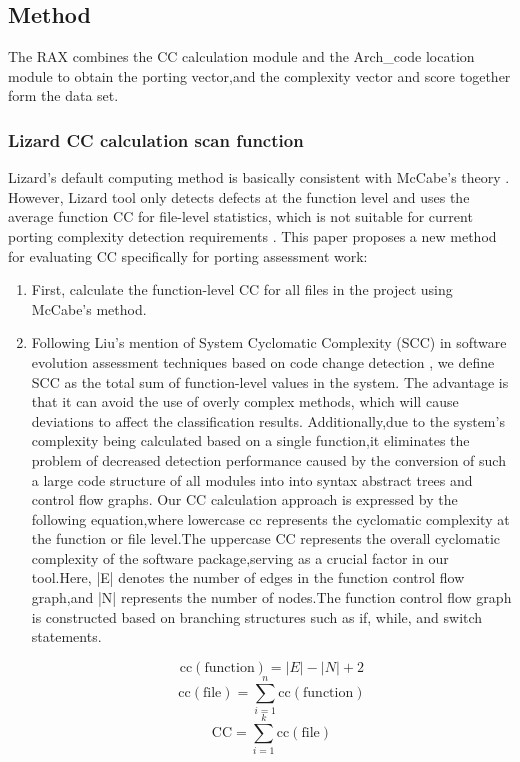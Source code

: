 \documentclass[sigconf,screen,review,anonymous]{acmart}
\begin{document}
\subsection{Method}
\label{sec:method}
The RAX combines the CC calculation module and the Arch\_code location module to obtain the porting vector,and the complexity vector and score together form the data set.

\subsubsection{Lizard CC calculation scan function}
Lizard's default computing method is basically consistent with McCabe's theory \cite{1702388}.
However, Lizard tool only detects defects at the function level and uses the average function CC for file-level statistics, which is not suitable for current porting complexity detection requirements \cite{9402593}.
This paper proposes a new method for evaluating CC specifically for porting assessment work:
\begin{enumerate}
  \item First, calculate the function-level CC for all files in the project using McCabe's method.
  \item Following Liu's mention of System Cyclomatic Complexity (SCC) in software evolution assessment techniques based on code change detection \cite{liuhuihui00}, we define SCC as the total sum of function-level values in the system.
  The advantage is that it can avoid the use of overly complex methods, which will cause deviations to affect the classification results.
  Additionally,due to the system's complexity being calculated based on a single function,it eliminates the problem of decreased detection performance caused by the conversion of such a large code structure of all modules into into syntax abstract trees and control flow graphs.
  Our CC calculation approach is expressed by the following equation,where lowercase cc represents the cyclomatic complexity at the function or file level.The uppercase CC represents the overall cyclomatic complexity of the software package,serving as a crucial factor in our tool.Here, |E| denotes the number of edges in the function control flow graph,and |N| represents the number of nodes.The function control flow graph is constructed based on branching structures such as if, while, and switch statements. 
  
  \begin{equation}
    \mathrm{cc}(\mathrm{function}) = \lvert E \rvert - \lvert N \rvert + 2
    \end{equation}
    \begin{equation}
      \mathrm{cc}(\mathrm{file}) =  \sum_{i=1}^{n} \mathrm{cc}(\mathrm{function})
      \end{equation}
      \begin{equation}
        \mathrm{CC} =  \sum_{i=1}^{k} \mathrm{cc}(\mathrm{file})
        \end{equation}


\end{enumerate}
\end{document}
